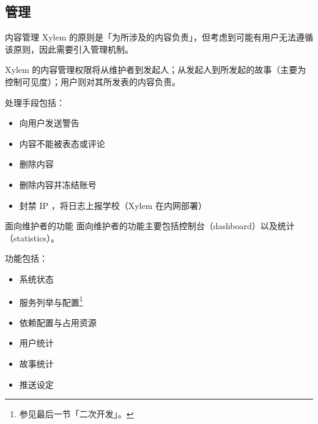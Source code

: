 \documentclass[UTF8]{ctexbeamer}
\begin{document}

\subsection{管理}

\begin{frame}{内容管理}
Xylem 的原则是「为所涉及的内容负责」，但考虑到可能有用户无法遵循该原则，因此需要引入管理机制。

Xylem 的内容管理权限将从维护者到发起人；从发起人到所发起的故事（主要为控制可见度）；用户则对其所发表的内容负责。

处理手段包括：
\small
\begin{itemize}
  \item 向用户发送警告
  \item 内容不能被表态或评论
  \item 删除内容
  \item 删除内容并冻结账号
  \item 封禁 IP ，将日志上报学校（Xylem 在内网部署）
\end{itemize}
\normalsize
\end{frame}

\begin{frame}{面向维护者的功能}
面向维护者的功能主要包括控制台（dashboard）以及统计（statistics）。

\small
功能包括：\begin{itemize}
  \item 系统状态
  \item 服务列举与配置\footnote[1]{参见最后一节「二次开发」。}
  \item 依赖配置与占用资源
  \item 用户统计
  \item 故事统计
  \item 推送设定
\end{itemize}
\normalsize
\end{frame}


\end{document}
